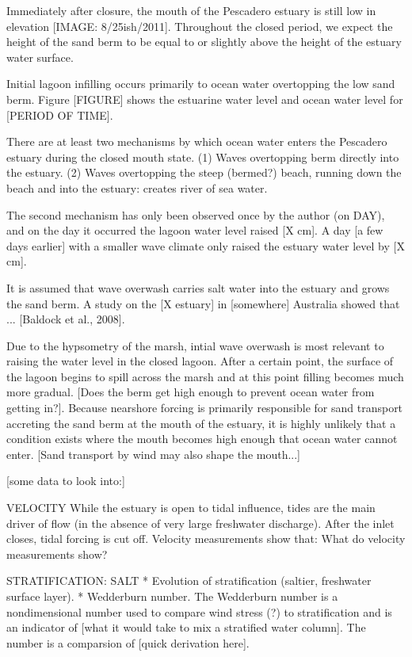 Immediately after closure, the mouth of the Pescadero estuary is still
low in elevation [IMAGE: 8/25ish/2011]. Throughout the closed period, we
expect the height of the sand berm to be equal to or slightly above the
height of the estuary water surface.

Initial lagoon infilling occurs primarily to ocean water overtopping the
low sand berm. Figure [FIGURE] shows the estuarine water level and ocean
water level for [PERIOD OF TIME].

There are at least two mechanisms by which ocean water enters the
Pescadero estuary during the closed mouth state. (1) Waves overtopping
berm directly into the estuary. (2) Waves overtopping the steep
(bermed?) beach, running down the beach and into the estuary: creates
river of sea water.

The second mechanism has only been observed once by the author (on DAY),
and on the day it occurred the lagoon water level raised [X cm]. A day
[a few days earlier] with a smaller wave climate only raised the estuary
water level by [X cm].

It is assumed that wave overwash carries salt water into the estuary and
grows the sand berm. A study on the [X estuary] in [somewhere] Australia
showed that ... [Baldock et al., 2008].



Due to the hypsometry of the marsh, intial wave overwash is most
relevant to raising the water level in the closed lagoon. After a
certain point, the surface of the lagoon begins to spill across the
marsh and at this point filling becomes much more gradual. [Does the
berm get high enough to prevent ocean water from getting in?]. Because
nearshore forcing is primarily responsible for sand transport accreting
the sand berm at the mouth of the estuary, it is highly unlikely that a
condition exists where the mouth becomes high enough that ocean water
cannot enter. [Sand transport by wind may also shape the mouth...]

[some data to look into:]



VELOCITY While the estuary is open to tidal influence, tides are the
main driver of flow (in the absence of very large freshwater discharge).
After the inlet closes, tidal forcing is cut off. Velocity measurements
show that: {What do velocity measurements show?}

STRATIFICATION: SALT * Evolution of stratification (saltier, freshwater
surface layer). * Wedderburn number. The Wedderburn number is a
nondimensional number used to compare wind stress (?) to stratification
and is an indicator of [what it would take to mix a stratified water
column]. The number is a comparsion of [quick derivation here].


